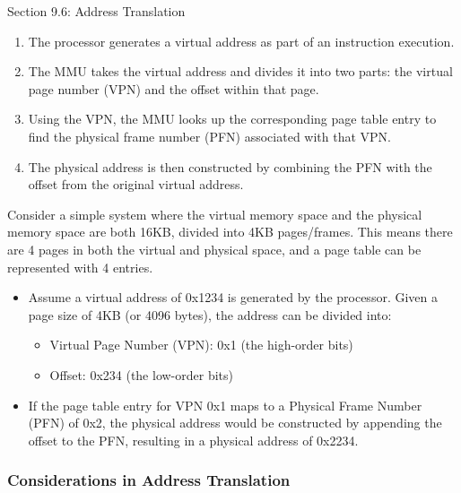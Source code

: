 \begin{notes}{Section 9.6: Address Translation}
    \begin{enumerate}
        \item The processor generates a virtual address as part of an instruction execution.
        \item The MMU takes the virtual address and divides it into two parts: the virtual page number (VPN) and the offset within that page.
        \item Using the VPN, the MMU looks up the corresponding page table entry to find the physical frame number (PFN) associated with that VPN.
        \item The physical address is then constructed by combining the PFN with the offset from the original virtual address.
    \end{enumerate}
    
    \begin{highlight}
        Consider a simple system where the virtual memory space and the physical memory space are both 16KB, divided into 4KB pages/frames. This means there are 4 pages in both the virtual and physical 
        space, and a page table can be represented with 4 entries.
        
        \begin{itemize}
            \item Assume a virtual address of 0x1234 is generated by the processor. Given a page size of 4KB (or 4096 bytes), the address can be divided into:
                \begin{itemize}
                    \item Virtual Page Number (VPN): 0x1 (the high-order bits)
                    \item Offset: 0x234 (the low-order bits)
                \end{itemize}    
            \item If the page table entry for VPN 0x1 maps to a Physical Frame Number (PFN) of 0x2, the physical address would be constructed by appending the offset to the PFN, resulting in a physical 
            address of 0x2234.
        \end{itemize}
    \end{highlight}
        
    \subsubsection*{Considerations in Address Translation}
    

\end{notes}
